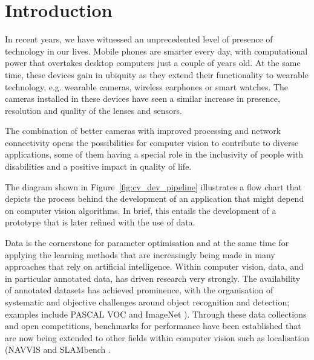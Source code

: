 \chapter{Introduction}\label{ch:introduction}

In recent years, we have witnessed an unprecedented level of presence of technology in our lives. Mobile phones are smarter every day, with computational power that overtakes desktop computers just a couple of years old. At the same time, these devices gain in ubiquity as they extend their functionality to wearable technology, e.g. wearable cameras, wireless earphones or smart watches. The cameras installed in these devices have seen a similar increase in presence, resolution and quality of the lenses and sensors.

The combination of better cameras with improved processing and network connectivity opens the possibilities for computer vision to contribute to diverse applications, some of them having a special role in the inclusivity of people with disabilities and a positive impact in quality of life.

The diagram shown in Figure~\ref{fig:cv_dev_pipeline} illustrates a flow chart that depicts the process behind the development of an application that might depend on computer vision algorithms. In brief, this entails the development of a prototype that is later refined with the use of data. 

Data is the cornerstone for parameter optimisation and at the same time for applying the learning methods that are increasingly being made in many approaches that rely on artificial intelligence. Within computer vision, data, and in particular annotated data, has driven research very strongly. The availability of annotated datasets has achieved prominence, with the organisation of systematic and objective challenges around object recognition and detection; examples include PASCAL VOC \cite{everingham2010pascal} and ImageNet \citep{Deng2009}). Through these data collections and open competitions, benchmarks for performance have been established that are now being extended to other fields within computer vision such as localisation (NAVVIS \cite{Huitl2012} and SLAMbench \cite{nardi2014introducing}.

